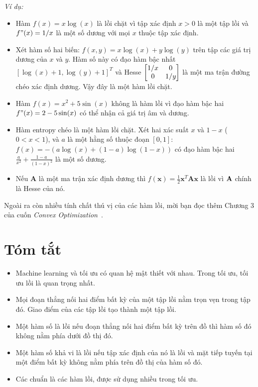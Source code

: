 {}
\textit{Ví dụ:}
\begin{itemize}
\item Hàm $f(x) = x\log(x)$ là lồi chặt vì tập xác định $x > 0$ là một tập lồi và $f"(x) = 1/x$ là một số
dương với mọi $x$ thuộc tập xác định.
\item Xét hàm số hai biến: $f(x, y) = x
\log(x) + y \log(y) $ trên tập các giá trị dương của $x$ và $y$. Hàm số này
có đạo hàm bậc nhất $[\log(x) + 1, \log(y) + 1]^T$ và Hesse $\left[\begin{matrix}
1/x & 0 \\ 0 & 1/y
\end{matrix}\right] $ là một ma trận đường chéo xác định dương. Vậy đây là một hàm lồi chặt.

\item Hàm $f(x) = x^2 + 5\sin(x)$ không là hàm lồi vì đạo hàm bậc hai $f"(x)
= 2 - 5\sin(x)$ có thể nhận cả giá trị âm và dương.

\item Hàm {entropy} chéo là một hàm lồi chặt. Xét hai xác suất $x$ và $1 - x$ ($0 < x < 1$), và $a$ là một hằng số thuộc
đoạn $[0, 1]$: $f(x) = -(a \log(x) + (1 - a) \log(1 - x))$ có
đạo hàm bậc hai $\frac{a}{x^2} + \frac{1 - a}{(1-x)^2}$ là một số dương.

\item Nếu $\mathbf{A}$ là một ma trận xác định dương thì $f(\mathbf{x}) =
\frac{1}{2}\mathbf{x}^T\mathbf{Ax}$ là lồi vì $\mathbf{A}$ chính là Hesse của nó.



\end{itemize}



Ngoài ra còn nhiều tính chất thú vị của các {hàm lồi}, mời bạn đọc thêm Chương 3 của cuốn \textit{Convex Optimization}~\cite{boyd2004convex}.


\section{Tóm tắt}
\begin{itemize}
\item Machine learning và tối ưu có quan hệ mật thiết với nhau. Trong
tối ưu, tối ưu lồi là quan trọng nhất.

\item Mọi đoạn thẳng nối hai điểm bất kỳ của một tập lồi nằm trọn vẹn trong tập đó. Giao điểm của các tập lồi tạo thành một
tập lồi.

\item Một hàm số là lồi nếu đoạn thẳng nối hai điểm bất kỳ trên đồ thì hàm
số đó {không nằm phía dưới} đồ thị đó.

\item Một hàm số khả vi là lồi nếu tập xác định của nó là lồi
và mặt tiếp tuyến tại một điểm bất kỳ {không nằm phía trên} đồ thị
của hàm số đó.

\item Các chuẩn là các hàm lồi, được sử dụng nhiều trong tối ưu.

\end{itemize}




